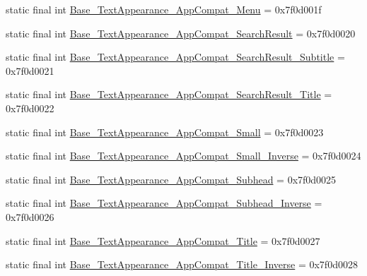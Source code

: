 \begin{DoxyCompactItemize}
\item 
static final int \mbox{\hyperlink{classandroid_1_1support_1_1v7_1_1appcompat_1_1_r_1_1style_a157293841296e17ba91feda6068d283f}{Base\+\_\+\+Text\+Appearance\+\_\+\+App\+Compat\+\_\+\+Menu}} = 0x7f0d001f
\item 
static final int \mbox{\hyperlink{classandroid_1_1support_1_1v7_1_1appcompat_1_1_r_1_1style_abe1dd23402a2ed299ed4cba9cf8bdb7f}{Base\+\_\+\+Text\+Appearance\+\_\+\+App\+Compat\+\_\+\+Search\+Result}} = 0x7f0d0020
\item 
static final int \mbox{\hyperlink{classandroid_1_1support_1_1v7_1_1appcompat_1_1_r_1_1style_afee2e2bbe4a577ea3cc8ddcd4101a2af}{Base\+\_\+\+Text\+Appearance\+\_\+\+App\+Compat\+\_\+\+Search\+Result\+\_\+\+Subtitle}} = 0x7f0d0021
\item 
static final int \mbox{\hyperlink{classandroid_1_1support_1_1v7_1_1appcompat_1_1_r_1_1style_a58274985c9e5e9b0b52989240ef93e73}{Base\+\_\+\+Text\+Appearance\+\_\+\+App\+Compat\+\_\+\+Search\+Result\+\_\+\+Title}} = 0x7f0d0022
\item 
static final int \mbox{\hyperlink{classandroid_1_1support_1_1v7_1_1appcompat_1_1_r_1_1style_ac1093d122fc007f82bf35e4bdd089958}{Base\+\_\+\+Text\+Appearance\+\_\+\+App\+Compat\+\_\+\+Small}} = 0x7f0d0023
\item 
static final int \mbox{\hyperlink{classandroid_1_1support_1_1v7_1_1appcompat_1_1_r_1_1style_ad2befb41e28e52eed35c0e927dfd9d5e}{Base\+\_\+\+Text\+Appearance\+\_\+\+App\+Compat\+\_\+\+Small\+\_\+\+Inverse}} = 0x7f0d0024
\item 
static final int \mbox{\hyperlink{classandroid_1_1support_1_1v7_1_1appcompat_1_1_r_1_1style_a0a4cf7b167f6f4d59fbfbcd4d755e48c}{Base\+\_\+\+Text\+Appearance\+\_\+\+App\+Compat\+\_\+\+Subhead}} = 0x7f0d0025
\item 
static final int \mbox{\hyperlink{classandroid_1_1support_1_1v7_1_1appcompat_1_1_r_1_1style_aa148f2da1dd47d8c68ab864b270466ce}{Base\+\_\+\+Text\+Appearance\+\_\+\+App\+Compat\+\_\+\+Subhead\+\_\+\+Inverse}} = 0x7f0d0026
\item 
static final int \mbox{\hyperlink{classandroid_1_1support_1_1v7_1_1appcompat_1_1_r_1_1style_aa5988904fde7a159365b0ae10f2ae9ac}{Base\+\_\+\+Text\+Appearance\+\_\+\+App\+Compat\+\_\+\+Title}} = 0x7f0d0027
\item 
static final int \mbox{\hyperlink{classandroid_1_1support_1_1v7_1_1appcompat_1_1_r_1_1style_a6ce7242b318c13a6a38d536cae248d89}{Base\+\_\+\+Text\+Appearance\+\_\+\+App\+Compat\+\_\+\+Title\+\_\+\+Inverse}} = 0x7f0d0028

\end{DoxyCompactItemize}
